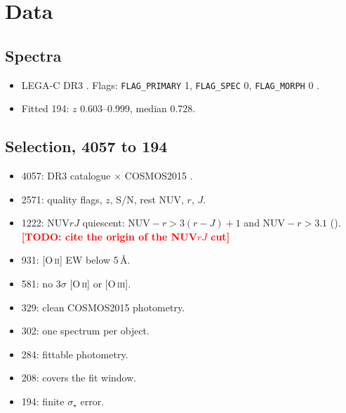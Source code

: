 \documentclass[fleqn,usenatbib]{mnras}
\newcommand{\todo}[1]{\textcolor{red}{\textbf{[TODO: #1]}}}
\newcommand{\sig}{\ensuremath{\sigma_\star}}
\begin{document}
\section{Data}
\subsection{Spectra}
\begin{itemize}
\item LEGA-C DR3 \citep{vanderWel2021}. Flags: \texttt{FLAG\_PRIMARY} 1, \texttt{FLAG\_SPEC} 0, \texttt{FLAG\_MORPH} 0 \citep[Sect.~4.2]{vanderWel2021}. 
\item Fitted 194: $z$ 0.603--0.999, median 0.728. 
\end{itemize}

\subsection{Selection, 4057 to 194}
\begin{itemize}
\item 4057: DR3 catalogue $\times$ COSMOS2015 \citep{Laigle2016}.
\item 2571: quality flags, $z$, S/N, rest NUV, $r$, $J$.
\item 1222: NUV$rJ$ quiescent: $\mathrm{NUV}-r > 3(r-J)+1$ and $\mathrm{NUV}-r>3.1$ (). \todo{cite the origin of the NUV$rJ$ cut}
\item 931: [O\,\textsc{ii}] EW below 5\,\AA.
\item 581: no $3\sigma$ [O\,\textsc{ii}] or [O\,\textsc{iii}].
\item 329: clean COSMOS2015 photometry.
\item 302: one spectrum per object.
\item 284: fittable photometry.
\item 208: covers the fit window.
\item 194: finite \sig{} error.
\end{itemize}
\end{document}
